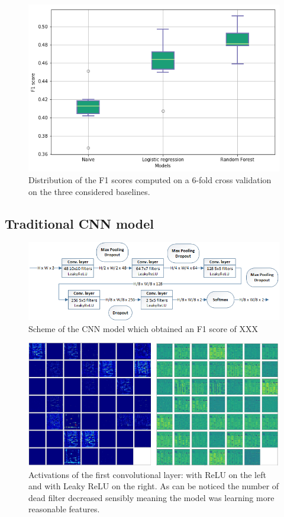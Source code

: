 \documentclass[10pt,conference,compsocconf]{IEEEtran}
\begin{document}
\begin{figure}[tbp]
	\centering
	\includegraphics[width=0.8\columnwidth]{img/boxplots_naive.png}
	\caption{Distribution of the F1 scores computed on a 6-fold cross validation on the three considered baselines.}
	\vspace{-3mm}
	\label{fig:baselines}
\end{figure}

\subsection{Traditional CNN model}
\begin{figure}[tbp]
	\centering
	\includegraphics[width=\columnwidth]{img/cnnModel.png}
	\caption{Scheme of the CNN model which obtained an F1 score of XXX }
	\vspace{-3mm}
	\label{fig:cnn-model}
\end{figure}
\begin{figure}[tbp]
	\centering
	\includegraphics[width=0.8\columnwidth]{img/featuremaps.jpg}
	\caption{Activations of the first convolutional layer: with ReLU on the left and with Leaky ReLU on the right. As can be noticed the number of dead filter decreased sensibly meaning the model was learning more reasonable features.}
	\vspace{-3mm}
	\label{fig:dead-filters}
\end{figure}
\end{document}
